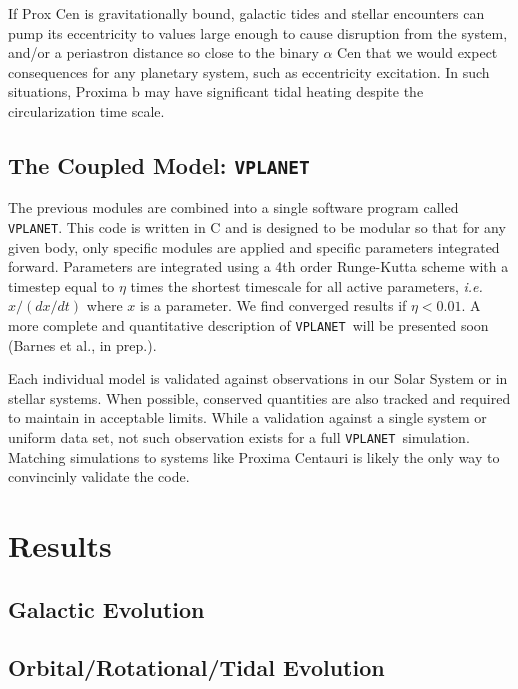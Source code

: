 \documentclass[preprint,12pt]{aastex}
\def\ie{{\it i.e.\ }}
\def\vplanet{\texttt{\footnotesize{VPLANET}}}
\begin{document}
If Prox Cen is gravitationally bound, galactic tides and stellar encounters can pump its eccentricity to values large enough to cause disruption from the system, and/or a periastron distance so close to the binary $\alpha$ Cen that we would expect consequences for any planetary system, such as eccentricity excitation. In such situations, Proxima b may have significant tidal heating despite the circularization time scale. 

\subsection{The Coupled Model: \vplanet}
The previous modules are combined into a single software program
called \vplanet. This code is written in C and is designed to be
modular so that for any given body, only specific modules are applied
and specific parameters integrated forward. Parameters are integrated
using a 4th order Runge-Kutta scheme with a timestep equal to $\eta$
times the shortest timescale for all active parameters, \ie
$x/(dx/dt)$ where $x$ is a parameter. We find converged results if
$\eta < 0.01$. A more complete and quantitative description of
\vplanet~will be presented soon (Barnes et al., in prep.). 

Each individual model is validated against observations in our Solar
System or in stellar systems. When possible, conserved quantities are
also tracked and required to maintain in acceptable limits. While a
validation against a single system or uniform data set, not such
observation exists for a full \vplanet~simulation. Matching
simulations to systems like Proxima Centauri is likely the only way to
convincinly validate the code.

\section{Results\label{sec:results}}

\subsection{Galactic Evolution}


\subsection{Orbital/Rotational/Tidal Evolution}
\end{document}
